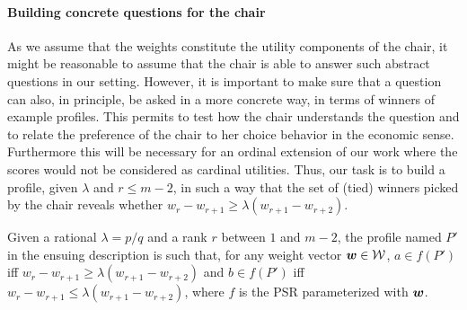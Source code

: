 \documentclass[sigconf, anonymous]{aamas}
\begin{document}
\paragraph{Building concrete questions for the chair}
As we assume that the weights constitute the utility components of the chair, it might be reasonable to assume that the chair is able to answer such abstract questions in our setting. However, it is important to make sure that a question can also, in principle, be asked in a more concrete way, in terms of winners of example profiles. This permits to test how the chair understands the question and to relate the preference of the chair to her choice behavior in the economic sense. 
Furthermore this will be necessary for an ordinal extension of our work where the scores would not be considered as cardinal utilities.
Thus, our task is to build a profile, given $\lambda$ and $r ≤ m-2$, in such a way that the set of (tied) winners picked by the chair reveals whether $w_{r} - w_{r+1} \geq \lambda (w_{r+1} - w_{r+2})$.
\begin{claim}
	Given a rational $\lambda = p/q$ and a rank $r$ between $1$ and $m - 2$, the profile named $P'$ in the ensuing description is such that, for any weight vector $\bm{w} \in \mathcal{W}$, $a \in f(P')$ iff $w_{r} - w_{r+1} ≥ \lambda (w_{r+1} - w_{r+2})$ and $b \in f(P')$ iff $w_{r} - w_{r+1} ≤ \lambda (w_{r+1} - w_{r+2})$, where $f$ is the PSR parameterized with $\bm{w}$.
\end{claim}
\end{document}
